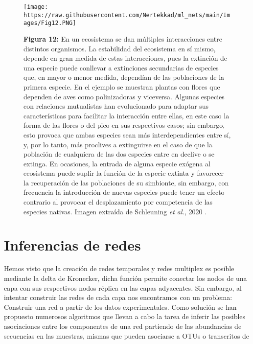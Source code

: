\documentclass[
]{book}
\begin{document}
\begin{figure}
\centering
\texttt{[image: https://raw.githubusercontent.com/Nertekkad/ml\_nets/main/Images/Fig12.PNG]}
\caption{\textbf{Figura 12:} En un ecosistema se dan múltiples interacciones entre distintos organismos. La estabilidad del ecosistema en sí mismo, depende en gran medida de estas interacciones, pues la extinción de una especie puede conllevar a extinciones secundarias de especies que, en mayor o menor medida, dependían de las poblaciones de la primera especie. En el ejemplo se muestran plantas con flores que dependen de aves como polinizadoras y viceversa. Algunas especies con relaciones mutualistas han evolucionado para adaptar sus características para facilitar la interacción entre ellas, en este caso la forma de las flores o del pico en sus respectivos casos; sin embargo, esto provoca que ambas especies sean más interdependientes entre sí, y, por lo tanto, más proclives a extinguirse en el caso de que la población de cualquiera de las dos especies entre en declive o se extinga. En ocasiones, la entrada de alguna especie exógena al ecosistema puede suplir la función de la especie extinta y favorecer la recuperación de las poblaciones de su simbionte, sin embargo, con frecuencia la introducción de nuevas especies puede tener un efecto contrario al provocar el desplazamiento por competencia de las especies nativas. Imagen extraída de Schleuning \emph{et al.}, 2020 \citep{schleuning2020trait}.}
\end{figure}

\hypertarget{inferencias-de-redes}{%
\section*{Inferencias de redes}\label{inferencias-de-redes}}

Hemos visto que la creación de redes temporales y redes multiplex es posible mediante la delta de Kronecker, dicha función permite conectar los nodos de una capa con sus respectivos nodos réplica en las capas adyacentes. Sin embargo, al intentar construir las redes de cada capa nos encontramos con un problema: Construir una red a partir de los datos experimentales. Como solución se han propuesto numerosos algoritmos que llevan a cabo la tarea de inferir las posibles asociaciones entre los componentes de una red partiendo de las abundancias de secuencias en las muestras, mismas que pueden asociarse a OTUs o transcritos de genes.

Para identificar la presencia de algún microorganismo o la expresión de algún gen a partir de una muestra se emplean métodos de amplificación de ácidos nucleicos, tales como el PCR o el RT-PCR, con el fin de identificar secuencias específicas. A partir del análisis de estas secuencias se obtienen las abundancias relativas, mismas que pueden interpretarse como el volumen de las secuencias identificadas en una muestra \citep{villaintroduction}.
\end{document}
